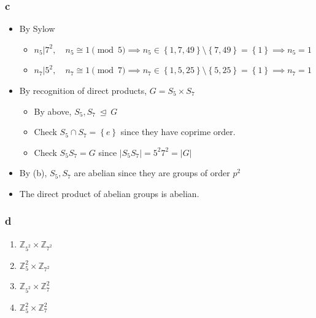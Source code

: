 \begin{solution}
\hypertarget{c-14}{%
\subsubsection{c}\label{c-14}}

\begin{itemize}
\item
  By Sylow

  \begin{itemize}
  \tightlist
  \item
    \(n_5 \mathrel{\Big|}7^2,\quad n_5\cong 1\pmod 5 \implies n_5\in\left\{{1, 7, 49}\right\}\setminus\left\{{7, 49}\right\} = \left\{{1}\right\} \implies n_5 = 1\)
  \item
    \(n_7 \mathrel{\Big|}5^2, \quad n_7 \cong 1 \pmod 7 \implies n_7 \in \left\{{1, 5, 25}\right\}\setminus\left\{{5, 25}\right\} =\left\{{1}\right\} \implies n_7 = 1\)
  \end{itemize}
\item
  By recognition of direct products, \(G = S_5 \times S_7\)

  \begin{itemize}
  \tightlist
  \item
    By above, \(S_5, S_7{~\trianglelefteq~}G\)
  \item
    Check \(S_5\cap S_7 = \left\{{e}\right\}\) since they have coprime
    order.
  \item
    Check \(S_5S_7 = G\) since
    \({\left\lvert {S_5 S_7} \right\rvert} = 5^2 7^2 = {\left\lvert {G} \right\rvert}\)
  \end{itemize}
\item
  By (b), \(S_5, S_7\) are abelian since they are groups of order
  \(p^2\)
\item
  The direct product of abelian groups is abelian.
\end{itemize}

\hypertarget{d-6}{%
\subsubsection{d}\label{d-6}}

\begin{enumerate}
\def\labelenumi{\arabic{enumi}.}
\tightlist
\item
  \({\mathbb{Z}}_{5^2} \times{\mathbb{Z}}_{7^2}\)
\item
  \({\mathbb{Z}}_{5}^2 \times{\mathbb{Z}}_{7^2}\)
\item
  \({\mathbb{Z}}_{5^2} \times{\mathbb{Z}}_{7}^2\)
\item
  \({\mathbb{Z}}_{5}^2 \times{\mathbb{Z}}_{7}^2\)
\end{enumerate}

\end{solution}

